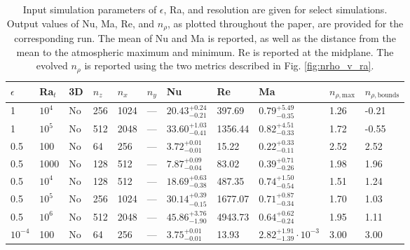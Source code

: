 \begin{table}
\begin{center}
\caption[Simulation information for Anders \& Brown 2017.]
{
	Input simulation parameters of $\epsilon$, Ra, and resolution are given for select simulations.
	Output values of Nu, Ma, Re, and $n_\rho$, as plotted throughout the paper, are provided for the corresponding run.  
	The mean of Nu and Ma is reported, as well as the distance from the mean to the atmospheric maximum and minimum.  
	Re is reported at the midplane.  
	The evolved $n_\rho$ is reported using the two metrics described in Fig. \ref{fig:nrho_v_ra}. 
	\label{table:run_info}
}
\begin{tabular}{ p{1cm} p{1cm} p{1cm} p{1cm} p{1cm} p{1cm} p{1.75cm} p{1.5cm} p{2.75cm} p{1cm} p{1.2cm}  }
\\
\hline
$\epsilon$	&	Ra$_t$	&	3D	&	$n_z$	&	$n_x$	&	$n_y$	&	Nu					&	Re	&	Ma					&	$n_{\rho, \text{max}}$	&	$n_{\rho, \text{bounds}}$	\\
\hline\hline
\vspace{0.08cm}1	&	$10^4$	&	No	&	256	&	1024	&	---	&$	20.43	_{-	0.21	}^{+	0.24	}$&	397.69	&$	0.79	_{-	0.35	}^{+	5.49	}$&	1.26	&	-0.21	\\
\vspace{0.08cm}1	&	$10^5$	&	No	&	512	&	2048	&	---	&$	33.60	_{-	0.41	}^{+	1.03	}$&	1356.44	&$	0.82	_{-	0.33	}^{+	4.51	}$&	1.72	&	-0.55	\\
\vspace{0.08cm}0.5	&	100	&	No	&	64	&	256	&	---	&$	3.72	_{-	0.01	}^{+	0.01	}$&	15.22	&$	0.22	_{-	0.11	}^{+	0.33	}$&	2.52	&	2.52	\\
\vspace{0.08cm}0.5	&	1000	&	No	&	128	&	512	&	---	&$	7.87	_{-	0.04	}^{+	0.09	}$&	83.02	&$	0.39	_{-	0.26	}^{+	0.71	}$&	1.98	&	1.96	\\
\vspace{0.08cm}0.5	&	$10^4$	&	No	&	128	&	512	&	---	&$	18.69	_{-	0.38	}^{+	0.63	}$&	487.35	&$	0.74	_{-	0.54	}^{+	1.50	}$&	1.51	&	1.24	\\
\vspace{0.08cm}0.5	&	$10^5$	&	No	&	256	&	1024	&	---	&$	30.14	_{-	0.15	}^{+	0.39	}$&	1677.07	&$	0.71	_{-	0.34	}^{+	0.87	}$&	1.70	&	1.03	\\
\vspace{0.08cm}0.5	&	$10^6$	&	No	&	512	&	2048	&	---	&$	45.86	_{-	1.90	}^{+	3.76	}$&	4943.73	&$	0.64	_{-	0.24	}^{+	0.62	}$&	1.95	&	1.11	\\
\vspace{0.08cm}$10^{-4}$	&	100	&	No	&	64	&	256	&	---	&$	3.75	_{-	0.01	}^{+	0.01	}$&	13.93	&$	2.82	_{-	1.39	}^{+	1.91}\cdot 10^{-3}	$&	3.00	&	3.00	\\

\end{tabular}
\end{center}
\end{table}
